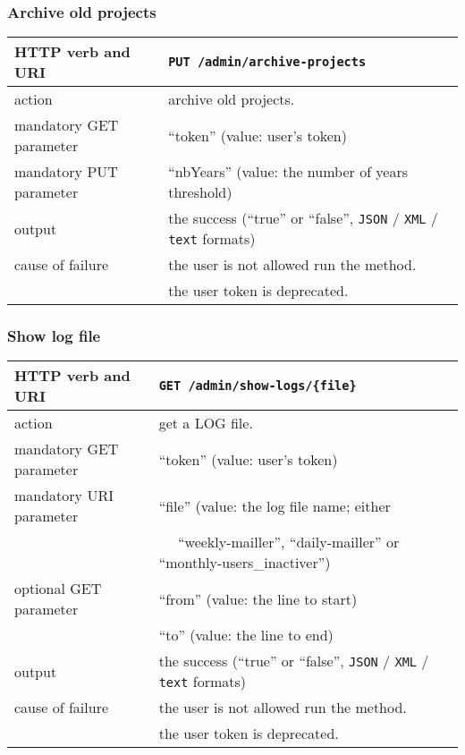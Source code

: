 \subsubsection{Archive old projects}
\begin{tabular}{ | l | l | }
	\hline
	HTTP verb and URI & \texttt{PUT /admin/archive-projects} \\
	\hline
	action & archive old projects. \\
	\hline
	mandatory GET parameter & ``token'' (value: user's token) \\
	\hline
	mandatory PUT parameter & ``nbYears'' (value: the number of years threshold) \\
	\hline
	output & the success (``true'' or ``false'', \texttt{JSON} / \texttt{XML} / \texttt{text} formats) \\
	\hline
	cause of failure & the user is not allowed run the method. \\
	\space & the user token is deprecated. \\
	\hline
\end{tabular}
\newline

\subsubsection{Show log file}
\begin{tabular}{ | l | l | }
	\hline
	HTTP verb and URI & \texttt{GET /admin/show-logs/\{file\}} \\
	\hline
	action & get a LOG file. \\
	\hline
	mandatory GET parameter & ``token'' (value: user's token) \\
	\hline
	mandatory URI parameter & ``file'' (value: the log file name; either \\
	\space & ~~ ``weekly-mailler'', ``daily-mailler'' or ``monthly-users\_inactiver'') \\
	\hline
	optional GET parameter & ``from'' (value: the line to start) \\
	\space & ``to'' (value: the line to end) \\
	\hline
	output & the success (``true'' or ``false'', \texttt{JSON} / \texttt{XML} / \texttt{text} formats) \\
	\hline
	cause of failure & the user is not allowed run the method. \\
	\space & the user token is deprecated. \\
	\hline
\end{tabular}
\newline

